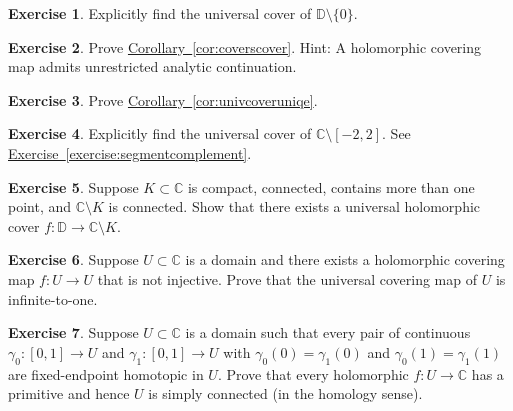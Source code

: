 \documentclass[12pt,openany]{book}
\newcommand{\C}{{\mathbb{C}}}
\newcommand{\D}{{\mathbb{D}}}
\theoremstyle{plain}
\theoremstyle{remark}
\theoremstyle{definition}
\newenvironment{exbox}{%
    \def\FrameCommand{\vrule width 1pt \relax\hspace{10pt}}%
    \MakeFramed{\advance\hsize-\width\FrameRestore}%
}{%
    \endMakeFramed
}
\theoremstyle{exercise}
\newtheorem{exercise}{Exercise}[section]
\theoremstyle{example}
\newcommand{\exerciseref}[1]{\hyperref[#1]{Exercise~\ref*{#1}}}
\newcommand{\corref}[1]{\hyperref[#1]{Corollary~\ref*{#1}}}
\begin{document}
\begin{exbox}
\begin{exercise}
Explicitly find the universal cover of $\D \setminus \{ 0 \}$.
\end{exercise}

\begin{exercise}
Prove \corref{cor:coverscover}.  Hint: A holomorphic covering map
admits unrestricted analytic continuation.
\end{exercise}

\begin{exercise}
Prove \corref{cor:univcoveruniqe}.
\end{exercise}

\begin{exercise}
Explicitly find the universal cover of $\C \setminus [-2,2]$.
See \exerciseref{exercise:segmentcomplement}.
\end{exercise}

\begin{exercise}
Suppose $K \subset \C$ is compact, connected, contains more than one
point, and $\C \setminus K$ is connected.  Show that there
exists a universal holomorphic cover $f \colon \D \to \C \setminus K$.
\end{exercise}

\begin{exercise}
Suppose $U \subset \C$ is a domain and there exists a
holomorphic covering map
$f \colon U \to U$ that is not injective.
Prove that the universal covering map of $U$ is infinite-to-one.
\end{exercise}

\begin{exercise} \label{exercise:EPHimpliesSC}
Suppose $U \subset \C$ is a domain such that 
every pair of continuous 
$\gamma_0 \colon [0,1] \to U$ and
$\gamma_1 \colon [0,1] \to U$
with
$\gamma_0(0)=\gamma_1(0)$ and
$\gamma_0(1)=\gamma_1(1)$ are fixed-endpoint homotopic in $U$.
Prove that every holomorphic $f \colon U \to \C$ has a primitive
and hence $U$ is simply connected (in the homology sense).
\end{exercise}
\end{exbox}


\appendix
\end{document}
